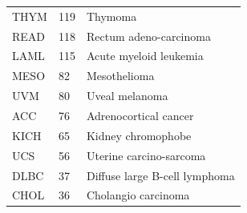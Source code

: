 \begin{table} [!ht]
\begin{center}
\begin{tabular}{l|l|l}
         THYM & 119  & Thymoma	 \\%
         READ & 118  & Rectum adeno-carcinoma \\%
         LAML & 115  & Acute myeloid leukemia	\\%
         MESO & 82  & Mesothelioma	\\%
         UVM & 80  & Uveal melanoma	 \\%
         ACC & 76  & Adrenocortical cancer	\\%
         KICH & 65  & Kidney chromophobe	\\%
         UCS & 56  & Uterine carcino-sarcoma	 \\%
         DLBC & 37  & Diffuse large B-cell lymphoma	\\%
         CHOL & 36  & Cholangio carcinoma	 \\%
         \bottomrule
    \end{tabular}
    \end{center}
\end{table}
